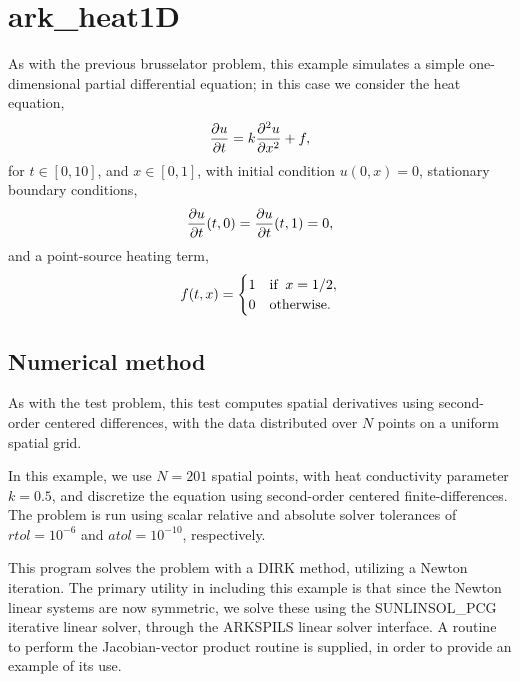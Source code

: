 \documentclass[letterpaper,10pt,english]{sphinxmanual}
\begin{document}
\section{ark\_heat1D}
\label{c_serial:ark-heat1d}\label{c_serial:id25}
As with the previous brusselator problem, this example simulates a
simple one-dimensional partial differential equation; in this case we
consider the heat equation,
\begin{gather}
\begin{split}\frac{\partial u}{\partial t} = k \frac{\partial^2 u}{\partial x^2} + f,\end{split}\notag
\end{gather}
for \(t \in [0, 10]\), and \(x \in [0, 1]\), with initial
condition \(u(0,x) = 0\), stationary boundary conditions,
\begin{gather}
\begin{split}\frac{\partial u}{\partial t}(t,0) = \frac{\partial u}{\partial t}(t,1) = 0,\end{split}\notag
\end{gather}
and a point-source heating term,
\begin{gather}
\begin{split}f(t,x) = \begin{cases} 1 & \text{if}\;\; x=1/2, \\
                       0 & \text{otherwise}. \end{cases}\end{split}\notag
\end{gather}

\subsection{Numerical method}
\label{c_serial:id26}
As with the {\hyperref[c_serial:ark-brusselator1d]{\emph{}}} test problem, this test computes
spatial derivatives using second-order centered differences, with the
data distributed over \(N\) points on a uniform spatial grid.

In this example, we use \(N=201\) spatial points, with heat
conductivity parameter \(k=0.5\), and discretize the equation
using second-order centered finite-differences.  The problem is run
using scalar relative and absolute solver tolerances of
\(rtol=10^{-6}\) and \(atol=10^{-10}\), respectively.

This program solves the problem with a DIRK method, utilizing a Newton
iteration.  The primary utility in including this example is that
since the Newton linear systems are now symmetric, we solve these
using the SUNLINSOL\_PCG iterative linear solver, through the ARKSPILS
linear solver interface.  A routine to perform the Jacobian-vector
product routine is supplied, in order to provide an example of its use.
\end{document}
